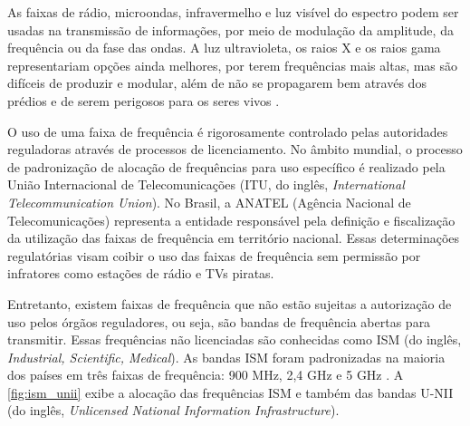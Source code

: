 \begin{figure}[H]
	\centering
\end{figure}

\begin{citacao}
	As faixas de rádio, microondas, infravermelho e luz visível do espectro podem ser usadas na transmissão de informações, por meio de modulação da amplitude, da frequência ou da fase das ondas. A luz ultravioleta, os raios X e os raios gama representariam opções ainda melhores, por terem frequências mais altas, mas são difíceis de produzir e modular, além de não se propagarem bem através dos prédios e de serem perigosos para os seres vivos \cite[p.~65]{tanenbaum2011}.
\end{citacao}

O uso de uma faixa de frequência é rigorosamente controlado pelas autoridades reguladoras através de processos de licenciamento. No âmbito mundial, o processo de padronização de alocação de frequências para uso específico é realizado pela União Internacional de Telecomunicações (ITU, do inglês, \textit{International Telecommunication Union}). No Brasil, a ANATEL (Agência Nacional de Telecomunicações) representa a entidade responsável pela definição e fiscalização da utilização das faixas de frequência em território nacional. Essas determinações regulatórias visam coibir o uso das faixas de frequência sem permissão por infratores como estações de rádio e TVs piratas.

Entretanto, existem faixas de frequência que não estão sujeitas a autorização de uso pelos órgãos reguladores, ou seja, são bandas de frequência abertas para transmitir. Essas frequências não licenciadas são conhecidas como ISM (do inglês, \textit{Industrial, Scientific, Medical}). As bandas ISM foram padronizadas na maioria dos países em três faixas de frequência: 900 MHz, 2,4 GHz e 5 GHz \cite{moraes2010,tanenbaum2011}. A \autoref{fig:ism_unii} exibe a alocação das frequências ISM e também das bandas U-NII (do inglês, \textit{Unlicensed National Information Infrastructure}).

